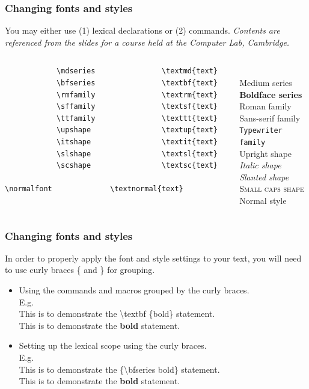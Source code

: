 \documentclass[11pt]{beamer}
\begin{document}
\begin{frame}[containsverbatim]
	\frametitle{Changing fonts and styles}
	
	You may either use (1) lexical declarations or (2) commands. \textit{\footnotesize Contents are referenced from the slides for a course held at the Computer Lab, Cambridge.}
	\begin{columns}
		\raggedleft
			\begin{verbatim}
			\mdseries
			\bfseries
			\rmfamily
			\sffamily
			\ttfamily
			\upshape
			\itshape
			\slshape
			\scshape
			\normalfont
			\end{verbatim}
			\begin{verbatim}
			\textmd{text}
			\textbf{text}
			\textrm{text}
			\textsf{text}
			\texttt{text}
			\textup{text}
			\textit{text}
			\textsl{text}
			\textsc{text}
			\textnormal{text}
			\end{verbatim}
			
			\bigskip
			\\
			\textmd{Medium series}\\
			\textbf{Boldface series}\\
			\textrm{Roman family}\\
			\textsf{Sans-serif family}\\
			\texttt{Typewriter family}\\
			\textup{Upright shape}\\
			\textit{Italic shape}\\
			\textsl{Slanted shape}\\
			\textsc{Small caps shape}\\
			\textnormal{Normal style}
	\end{columns}
\end{frame}

\begin{frame}[containsverbatim]
\frametitle{Changing fonts and styles}

	In order to properly apply the font and style settings to your text, you will need to use curly braces \{ and \} for grouping.
	
	\begin{itemize}
		\item Using the commands and macros grouped by the curly braces.\\ E.g. \\
		This is to demonstrate the \textbackslash textbf \{bold\} statement. \\
		This is to demonstrate the \textbf{bold} statement.
		\item Setting up the lexical scope using the curly braces.\\ E.g. \\
		This is to demonstrate the \{\textbackslash bfseries bold\} statement.\\
		This is to demonstrate the {\bfseries bold} statement.
	\end{itemize}

\end{frame}
\end{document}
